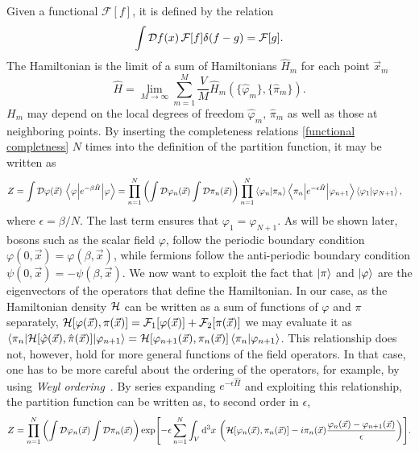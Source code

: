 Given a functional $\mathcal{F}[f]$, it is defined by the relation
\begin{equation}
    \int \mathcal{D} f(x)\, \mathcal{F}[f] \delta(f - g) = \mathcal{F}[g].
\end{equation}
The Hamiltonian is the limit of a sum of Hamiltonians $\hat H_m$ for each point $\vec x_m$
\begin{equation*}
    \hat H
    = \lim_{M \rightarrow \infty} \sum_{m=1}^M 
    \frac{V}{M} \hat H_m(\{\hat \varphi_m\}, \{\hat \pi_m\}).
\end{equation*}
$H_m$ may depend on the local degrees of freedom $\hat \varphi_m, \, \hat \pi_m$ as well as those at neighboring points.
By inserting the completeness relations \autoref{functional completness} $N$ times into the definition of the partition function, it may be written as
\begin{align*}
    Z& 
    = \int \mathcal{D}\varphi(\vec x) \, \left\langle \varphi {\left| e^{- \beta \hat H} \right|} \varphi \right\rangle
    = 
    \prod_{n=1}^N
    \left(
        \int \mathcal{D} \varphi_n (\vec x) \int \mathcal{D} \pi_n(\vec x)
    \right) 
    \prod_{n=1}^N  \braket{\varphi_n}{\pi_n}
    \left\langle \pi_n {\left| e^{- \epsilon \hat H} \right|} \varphi_{n+1} \right\rangle \braket{\varphi_{1}}{\varphi_{N+1}},
\end{align*}
where $\epsilon = \beta / N$. The last term ensures that $\varphi_1 = \varphi_{N+1}$.
As will be shown later, bosons such as the scalar field $\varphi$, follow the periodic boundary condition $\varphi(0, \vec x) = \varphi(\beta, \vec x)$, while fermions follow the anti-periodic boundary condition $\psi(0, \vec x) = -\psi(\beta, \vec x)$.
We now want to exploit the fact that $\ket{\pi}$ and $\ket{\varphi}$ are the eigenvectors of the operators that define the Hamiltonian.
In our case, as the Hamiltonian density $\mathcal{H}$ can be written as a sum of functions of $\varphi$ and $\pi$ separately, $\mathcal{H}[\varphi(\vec x), \pi(\vec x)] = \mathcal{F}_1[\varphi(\vec x)] + \mathcal{F}_2[\pi(\vec x)]$ we may evaluate it as $\left\langle \pi_n {\left| \mathcal{H}[\hat \varphi(\vec x), \hat \pi(\vec x)] \right|} \varphi_{n+1} \right\rangle = \mathcal{H}[\varphi_{n+1}(\vec x), \pi_n(\vec x)] \braket{\pi_n}{\varphi_{n+1}}$.
This relationship does not, however, hold for more general functions of the field operators.
In that case, one has to be more careful about the ordering of the operators, for example, by using \emph{Weyl ordering}~\cite{Peskin:IntroQFT}.
By series expanding $e^{-\epsilon \hat H}$ and exploiting this relationship, the partition function can be written as, to second order in $\epsilon$,
\begin{align*}
    Z = 
    \prod_{n=1}^N  
    \left(
        \int \mathcal{D} \varphi_n (\vec x) \int \mathcal{D} \pi_n(\vec x)
    \right)
    \exp[-\epsilon \sum_{n=1}^N \int_V \dd^3x \,
    \left(
        \mathcal{H}[\varphi_n(\vec x), \pi_n(\vec x)] - i \pi_n(\vec x) \frac{\varphi_n(\vec x) - \varphi_{n+1}(\vec x)}{\epsilon}
    \right)
    ].
\end{align*}
